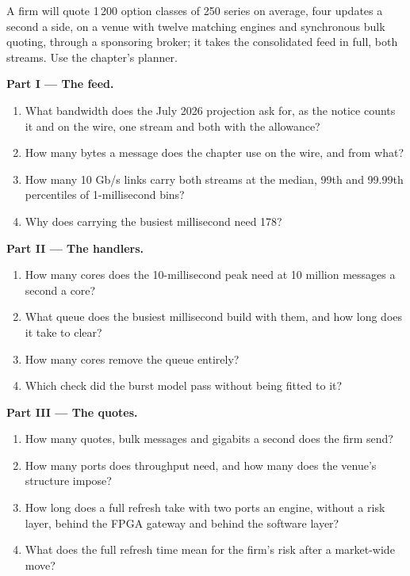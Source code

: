 \begin{problem}\label{pb:nw:equities-and-options-connectivity:1}
A firm will quote 1\,200 option classes of 250 series on average, four updates a second a side, on a venue with twelve matching
engines and synchronous bulk quoting, through a sponsoring broker; it takes the consolidated feed in full, both streams. Use the
chapter's planner.

\medskip\noindent\textbf{Part I --- The feed.}
\begin{enumerate}
\item What bandwidth does the July 2026 projection ask for, as the notice counts it and on the wire, one stream and both with the
  allowance?
\item How many bytes a message does the chapter use on the wire, and from what?
\item How many 10 Gb/s links carry both streams at the median, 99th and 99.99th percentiles of 1-millisecond bins?
\item Why does carrying the busiest millisecond need 178?
\end{enumerate}

\medskip\noindent\textbf{Part II --- The handlers.}
\begin{enumerate}[resume]
\item How many cores does the 10-millisecond peak need at 10 million messages a second a core?
\item What queue does the busiest millisecond build with them, and how long does it take to clear?
\item How many cores remove the queue entirely?
\item Which check did the burst model pass without being fitted to it?
\end{enumerate}

\medskip\noindent\textbf{Part III --- The quotes.}
\begin{enumerate}[resume]
\item How many quotes, bulk messages and gigabits a second does the firm send?
\item How many ports does throughput need, and how many does the venue's structure impose?
\item How long does a full refresh take with two ports an engine, without a risk layer, behind the FPGA gateway and behind the
  software layer?
\item What does the full refresh time mean for the firm's risk after a market-wide move?
\end{enumerate}


\end{problem}
